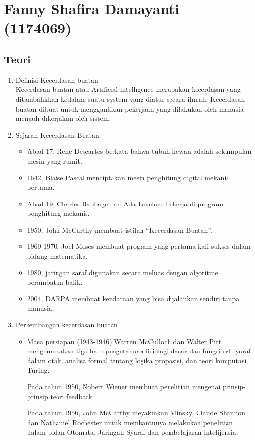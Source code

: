 \section{Fanny Shafira Damayanti (1174069)}
\subsection{Teori}
\begin{enumerate}
\item Definisi Kecerdasan buatan\\ 
Kecerdasan buatan atau Artificial intelligence merupakan kecerdasan yang ditambahkkan kedalam suatu system yang diatur secara ilmiah. Kecerdasan buatan dibuat untuk menggantikan pekerjaan yang dilakukan oleh manusia menjadi dikerjakan oleh sistem.

\item Sejarah Kecerdasan Buatan
\begin{itemize}
\item Abad 17, Rene Descartes berkata bahwa tubuh hewan adalah sekumpulan mesin yang rumit.
\item 1642, Blaise Pascal menciptakan mesin penghitung digital mekanis pertama.
\item Abad 19, Charles Babbage dan Ada Lovelace bekerja di program penghitung mekanis.
\item 1950, John McCarthy membuat istilah “Kecerdasan Buatan”.
\item 1960-1970, Joel Moses membuat program yang pertama kali sukses dalam bidang matematika.
\item 1980, jaringan saraf digunakan secara meluas dengan algoritme perambatan balik.
\item 2004, DARPA membuat kendaraan yang bisa dijalankan sendiri tanpa manusia.
\end{itemize}

\item Perkembangan kecerdasan buatan
\begin{itemize}
\item Masa persiapan (1943-1946)
Warren McCulloch dan Walter Pitt mengemukakan tiga hal : pengetahuan fisiologi dasar dan fungsi sel syaraf dalam otak, analisa formal tentang logika proposisi, dan teori komputasi Turing.

Pada tahun 1950, Nobert Wiener membuat penelitian mengenai prinsip-prinsip teori feedback.

Pada tahun 1956, John McCarthy meyakinkan Minsky, Claude Shannon dan Nathaniel Rochester untuk membantunya melakukan penelitian dalam bidan Otomata, Jaringan Syaraf dan pembelajaran intelijensia. 


\end{itemize}
\end{enumerate}
